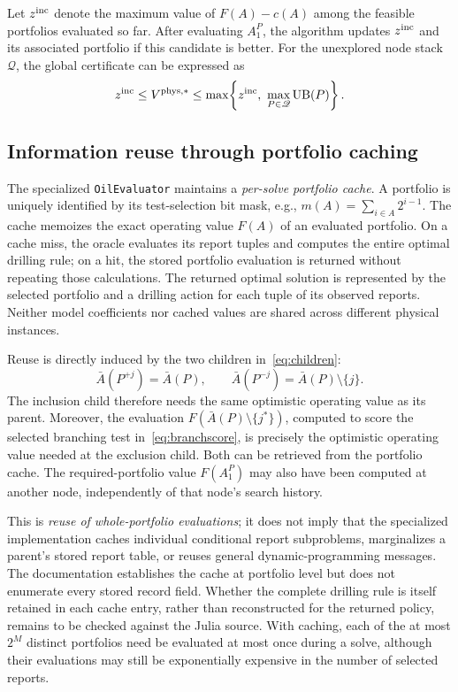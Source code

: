 \documentclass[11pt,a4paper]{article}
\begin{document}
Let $z^{\rm inc}$ denote the maximum value of $F(A)-c(A)$ among the feasible portfolios evaluated so far. After evaluating $A_1^P$, the algorithm updates $z^{\rm inc}$ and its associated portfolio if this candidate is better. For the unexplored node stack $\mathscr Q$, the global certificate can be expressed as
\begin{equation}\label{eq:globalbounds}
 z^{\rm inc}\le V^{\mathrm{phys},*}\le
 \max\!\left\{z^{\rm inc},\ \max_{P\in\mathscr Q}\operatorname{UB}(P)\right\}.
\end{equation}

\subsection{Information reuse through portfolio caching}\label{sec:reuse}
The specialized \texttt{OilEvaluator} maintains a \emph{per-solve portfolio cache}. A portfolio is uniquely identified by its test-selection bit mask, e.g., $m(A)=\sum_{i\in A}2^{i-1}$. The cache memoizes the exact operating value $F(A)$ of an evaluated portfolio. On a cache miss, the oracle evaluates its report tuples and computes the entire optimal drilling rule; on a hit, the stored portfolio evaluation is returned without repeating those calculations. The returned optimal solution is represented by the selected portfolio and a drilling action for each tuple of its observed reports. Neither model coefficients nor cached values are shared across different physical instances.

Reuse is directly induced by the two children in~\eqref{eq:children}:
\begin{equation}\label{eq:reusechild}
 \bar A(P^{+j})=\bar A(P),\qquad
 \bar A(P^{-j})=\bar A(P)\setminus\{j\}.
\end{equation}
The inclusion child therefore needs the same optimistic operating value as its parent. Moreover, the evaluation $F(\bar A(P)\setminus\{j^*\})$, computed to score the selected branching test in~\eqref{eq:branchscore}, is precisely the optimistic operating value needed at the exclusion child. Both can be retrieved from the portfolio cache. The required-portfolio value $F(A_1^P)$ may also have been computed at another node, independently of that node's search history.

This is \emph{reuse of whole-portfolio evaluations}; it does not imply that the specialized implementation caches individual conditional report subproblems, marginalizes a parent's stored report table, or reuses general dynamic-programming messages. The documentation establishes the cache at portfolio level but does not enumerate every stored record field. Whether the complete drilling rule is itself retained in each cache entry, rather than reconstructed for the returned policy, remains to be checked against the Julia source. With caching, each of the at most $2^M$ distinct portfolios need be evaluated at most once during a solve, although their evaluations may still be exponentially expensive in the number of selected reports.
\end{document}

